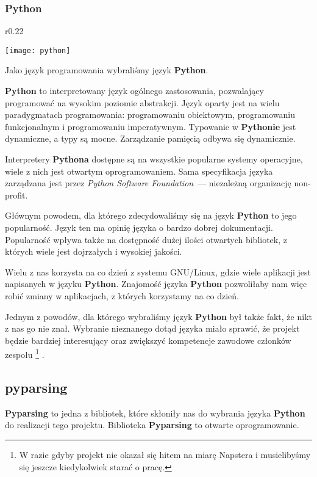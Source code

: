 \subsubsection{Python}

\begin{wrapfigure}{r}{0.22\textwidth}
  \begin{center}
    \texttt{[image: python]}
  \end{center}
\end{wrapfigure}
Jako język programowania wybraliśmy język \textbf{Python}.

\textbf{Python} to interpretowany język ogólnego zastosowania, pozwalający programować na wysokim poziomie abstrakcji.
Język oparty jest na wielu paradygmatach programowania: programowaniu obiektowym, programowaniu funkcjonalnym i programowaniu imperatywnym.
Typowanie w \textbf{Pythonie} jest dynamiczne, a typy są mocne.
Zarządzanie pamięcią odbywa się dynamicznie.

Interpretery \textbf{Pythona} dostępne są na wszystkie popularne systemy operacyjne, wiele z nich jest otwartym oprogramowaniem.
Sama specyfikacja języka zarządzana jest przez \emph{Python Software Foundation}~--- niezależną organizację non-profit.

Głównym powodem, dla którego zdecydowaliśmy się na język \textbf{Python} to jego popularność.
Język ten ma opinię języka o bardzo dobrej dokumentacji.
Popularność wpływa także na dostępność dużej ilości otwartych bibliotek, z których wiele jest dojrzałych i wysokiej jakości.

Wielu z nas korzysta na co dzień z systemu GNU/Linux, gdzie wiele aplikacji jest napisanych w języku \textbf{Python}.
Znajomość języka \textbf{Python} pozwoliłaby nam więc robić zmiany w aplikacjach, z których korzystamy na co dzień.

Jednym z powodów, dla którego wybraliśmy język \textbf{Python} był także fakt, że nikt z nas go nie znał.
Wybranie nieznanego dotąd języka miało sprawić, że projekt będzie bardziej interesujący oraz zwiększyć kompetencje zawodowe członków zespołu
\footnote{W razie gdyby projekt nie okazał się hitem na miarę Napstera i musielibyśmy się jeszcze kiedykolwiek starać o pracę.}
.

\subsection{pyparsing}
\textbf{Pyparsing} to jedna z bibliotek, które skłoniły nas do wybrania języka \textbf{Python} do realizacji tego projektu.
Biblioteka \textbf{Pyparsing} to otwarte oprogramowanie.

